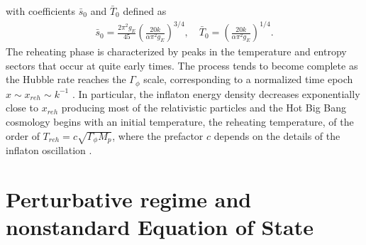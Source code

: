 \documentclass[%
aps,prd,nofootinbib,showkeys,a4paper,10pt
]{revtex4-2}
\begin{document}
with coefficients $\bar{s}_0$ and $\bar{T}_0$ defined as
\begin{eqnarray}
\bar{s}_0= \frac{2\pi^2 g_E}{45} \left(\frac{20k}{\alpha\pi^2g_E}\right)^{3/4},   
\quad \bar{T}_0= \left(\frac{20k}{\alpha\pi^2g_E}\right)^{1/4}.
\end{eqnarray}
The reheating phase is characterized by peaks in the temperature and entropy sectors that occur at quite early times. The process 
tends to become complete as the Hubble rate reaches the $\Gamma_{\phi}$ scale, 
corresponding to a normalized time epoch $x\sim x_{reh}\sim k^{-1}$ \cite{29}.
In particular, the inflaton energy density decreases exponentially close to $x_{reh}$ producing most of the relativistic particles 
and the Hot Big Bang cosmology begins with an initial temperature, the reheating temperature, of the order of $T_{reh}= c \sqrt{\Gamma_{\phi}M_p}$, 
where the prefactor $c$ depends on the details of the inflaton oscillation \cite{29}.


\section{Perturbative regime and nonstandard Equation of State}
\end{document}
